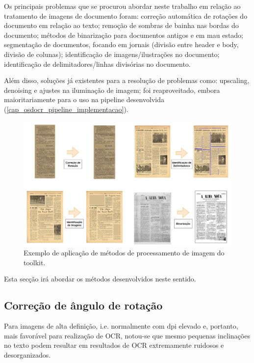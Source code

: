 Os principais problemas que se procurou abordar neste trabalho em relação ao tratamento de imagens de documento foram: correção automática de rotações do documento em relação ao texto; remoção de sombras de bainha nas bordas do documento; métodos de binarização para documentos antigos e em mau estado; segmentação de documentos, focando em jornais (divisão entre header e body, divisão de colunas); identificação de imagens/ilustrações no documento; identificação de delimitadores/linhas divisórias no documento. 

Além disso, soluções já existentes para a resolução de problemas como: upscaling, denoising e ajustes na iluminação de imagem; foi reaproveitado, embora maioritariamente para o uso na pipeline desenvolvida (\ref{cap_osdocr_pipeline_implementacao}).


\begin{figure}[H]
	\centering
	\includegraphics[width=1\textwidth]{images/ilustracoes/image_processing_examples.png}
	\caption{Exemplo de aplicação de métodos de processamento de imagem do toolkit.}
	\label{fig:image_processing_examples}
\end{figure}


Esta secção irá abordar os métodos desenvolvidos neste sentido.


\subsection{Correção de ângulo de rotação}
\label{contribution_image_rotation_correction}

Para imagens de alta definição, i.e. normalmente com dpi elevado e, portanto, mais favorável para realização de OCR, notou-se que mesmo pequenas inclinações no texto podem resultar em resultados de OCR extremamente ruidosos e desorganizados.

